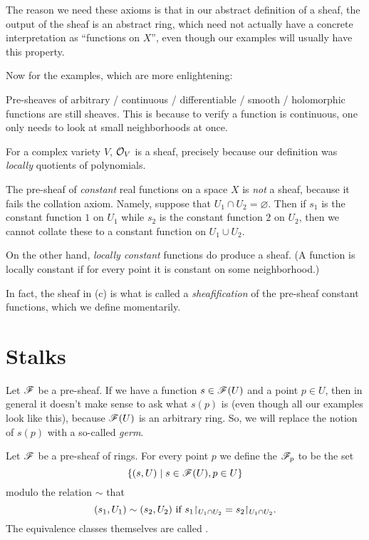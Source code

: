 The reason we need these axioms is that in our abstract definition of a sheaf,
the output of the sheaf is an abstract ring, which need not actually
have a concrete interpretation as ``functions on $X$'', even though
our examples will usually have this property.

Now for the examples, which are more enlightening:
\begin{example}
	\listhack
	\begin{enumerate}[(a)]
		\ii Pre-sheaves of arbitrary / continuous / differentiable / smooth
		/ holomorphic functions are still sheaves.
		This is because to verify a function is continuous,
		one only needs to look at small neighborhoods at once.
		
		\ii For a complex variety $V$, $\mathcal O_V$ is a sheaf,
		precisely because our definition was \emph{locally} quotients
		of polynomials.

		\ii The pre-sheaf of \emph{constant} real functions on a space $X$
		is \emph{not} a sheaf, because it fails the collation axiom.
		Namely, suppose that $U_1 \cap U_2 = \varnothing$.
		Then if $s_1$ is the constant function $1$ on $U_1$
		while $s_2$ is the constant function $2$ on $U_2$,
		then we cannot collate these to a constant function on $U_1 \cup U_2$.

		\ii On the other hand, \emph{locally constant} functions
		do produce a sheaf. (A function is locally constant
		if for every point it is constant on some neighborhood.)
	\end{enumerate}
	In fact, the sheaf in (c) is what is called a \emph{sheafification}
	of the pre-sheaf constant functions, which we define momentarily.
\end{example}

\section{Stalks}
Let $\mathscr F$ be a pre-sheaf.
If we have a function $s \in \mathscr F(U)$ and a point $p \in U$,
then in general it doesn't make sense to ask what $s(p)$ is
(even though all our examples look like this),
because $\mathscr F(U)$ is an arbitrary ring.
So, we will replace the notion of $s(p)$ with a so-called \emph{germ}.

\begin{definition}
	Let $\mathscr F$ be a pre-sheaf of rings.
	For every point $p$ we define the  $\mathscr F_p$ to be the set
	\[ \left\{ (s, U) \mid s \in \mathscr F(U), p \in U \right\} \]
	modulo the relation $\sim$ that 
	\[ (s_1,U_1) \sim (s_2, U_2) \text{ if }
		s_1 \restrict{U_1 \cap U_2} = s_2 \restrict{U_1 \cap U_2}. \]
	The equivalence classes themselves are called .
\end{definition}

